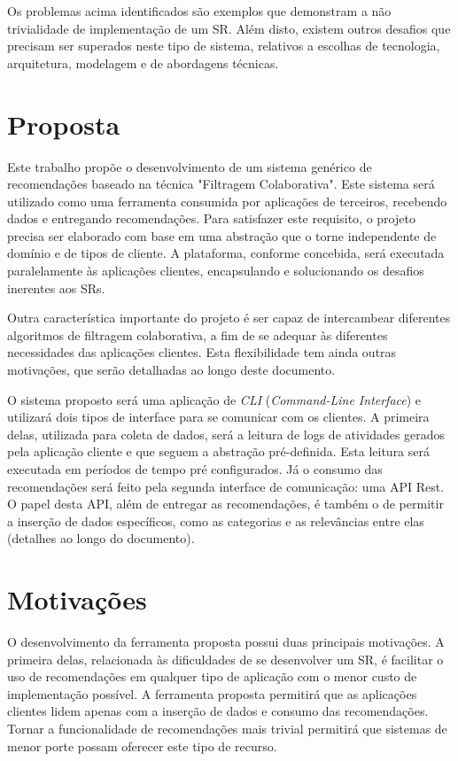 \documentclass[
	12pt,				%
    oneside,			%
	a4paper,			%
	english,			%
	french,				%
	spanish,			%
	brazil,				%
	]{abntex2}
\begin{document}
Os problemas acima identificados são exemplos que demonstram a não trivialidade de implementação de um SR. Além disto, existem outros desafios que precisam ser
superados neste tipo de sistema, relativos a escolhas de tecnologia, arquitetura, modelagem e de abordagens técnicas. 

\section{Proposta}
Este trabalho propõe o desenvolvimento de um sistema genérico de recomendações baseado na técnica "Filtragem Colaborativa". Este sistema será utilizado como uma ferramenta
consumida por aplicações de terceiros, recebendo dados e entregando recomendações. Para satisfazer este requisito, o projeto precisa ser elaborado com base em
uma abstração que o torne independente de domínio e de tipos de cliente. A plataforma, conforme concebida, será executada paralelamente às aplicações clientes,
encapsulando e solucionando os desafios inerentes aos SRs.

Outra característica importante do projeto é ser capaz de intercambear diferentes algoritmos de filtragem colaborativa, a fim de se adequar às diferentes necessidades
das aplicações clientes. Esta flexibilidade tem ainda outras motivações, que serão detalhadas ao longo deste documento. 

O sistema proposto será uma aplicação de \textit{CLI} (\textit{Command-Line Interface}) e utilizará dois tipos de interface para se comunicar com os clientes. A primeira delas, utilizada para coleta 
de dados, será a leitura de logs de atividades gerados pela aplicação cliente e que seguem a abstração pré-definida. Esta leitura será executada em períodos 
de tempo pré configurados. Já o consumo das recomendações será feito pela segunda interface de comunicação: uma API Rest. O papel desta API, além de entregar as
recomendações, é também o de permitir a inserção de dados específicos, como as categorias e as relevâncias entre elas (detalhes ao longo do documento). 

\section{Motivações}
O desenvolvimento da ferramenta proposta possui duas principais motivações. A primeira delas, relacionada às dificuldades de se desenvolver um SR, é facilitar o uso
de recomendações em qualquer tipo de aplicação com o menor custo de implementação possível. A ferramenta proposta permitirá que as aplicações clientes lidem apenas
com a inserção de dados e consumo das recomendações. Tornar a funcionalidade de recomendações mais trivial permitirá que sistemas de menor porte
possam oferecer este tipo de recurso.
\end{document}
